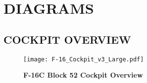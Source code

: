 \documentclass[fontInter]{TechCheck}
\begin{document}
	\section{DIAGRAMS}

	\subsection{COCKPIT OVERVIEW}
	\begin{figure}[h]
		\centering
		\texttt{[image: F-16\_Cockpit\_v3\_Large.pdf]}
		\caption{\textbf{F-16C Block 52 Cockpit Overview}}
		\label{fig:cockpitoverview}
	\end{figure}

  \cleardoublepage

\iftoggle{print}{
	\pagestyle{superempty}
	\newpage \null
	\thumbwide
	\newpage \null
}{}
\end{document}
